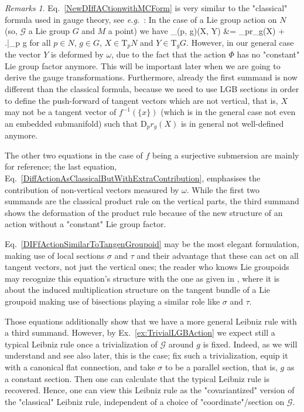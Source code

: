 \documentclass[a4paper,oneside,11pt,bibliography=totoc]{scrartcl}
\makeatletter
\def\oversortoftilde#1{\mathop{\vbox{\m@th\ialign{##\crcr\noalign{\kern3\p@}%
      \sortoftildefill\crcr\noalign{\kern3\p@\nointerlineskip}%
      $\hfil\displaystyle{#1}\hfil$\crcr}}}\limits}
\def\sortoftildefill{$\m@th \setbox\z@\hbox{$\braceld$}%
  \braceld\leaders\vrule \@height\ht\z@ \@depth\z@\hfill\braceru$}
\def\bas#1\eas{\begin{align*}#1\end{align*}}
\theoremstyle{plain}
\theoremstyle{remark}
\newtheorem{remark}[theorem]{Remarks}
\theoremstyle{definition}
\makeatother
\begin{document}
\begin{remark}
\leavevmode\newline
Eq.\ \eqref{NewDIffACtionwithMCForm} is very similar to the "classical" formula used in gauge theory, see \textit{e.g.}\ \cite[\S 3.5, Prop.\ 3.5.4, page 146]{Hamilton}: In the case of a Lie group action on $N$ (so, $\mathcal{G}$ a Lie group $G$ and $M$ a point) we have
\bas
\mathrm{D}_{(p, g)}\Phi(X, Y)
&=
_pr_g(X)
	+ \mleft.\oversortoftilde{(\mu_G)_g(Y)}\mright|_{p \cdot g}
\eas
for all $p \in N$, $g \in G$, $X \in \mathrm{T}_pN$ and $Y \in \mathrm{T}_g G$.
However, in our general case the vector $Y$ is deformed by $\omega$, due to the fact that the action $\Phi$ has no "constant" Lie group factor anymore. This will be important later when we are going to derive the gauge transformations. Furthermore, already the first summand is now different than the classical formula, because we need to use LGB sections in order to define the push-forward of tangent vectors which are not vertical, that is, $X$ may not be a tangent vector of $f^{-1}(\{x\})$ (which is in the general case not even an embedded submanifold) such that $\mathrm{D}_p r_g(X)$ is in general not well-defined anymore.

The other two equations in the case of $f$ being a surjective submersion are mainly for reference; the last equation, Eq.\ \eqref{DiffActionAsClassicalButWithExtraContribution}, emphasises the contribution of non-vertical vectors measured by $\omega$. While the first two summands are the classical product rule on the vertical parts, the third summand shows the deformation of the product rule because of the new structure of an action without a "constant" Lie group factor.

Eq.\ \eqref{DIFfActionSimilarToTangenGroupoid} may be the most elegant formulation, making use of local sections $\sigma$ and $\tau$ and their advantage that these can act on all tangent vectors, not just the vertical ones; the reader who knows Lie groupoids may recognize this equation's structure with the one as given in \cite[\S 1.4, Thm.\ 1.4.14, page 28]{mackenzieGeneralTheory}, where it is about the induced multiplication structure on the tangent bundle of a Lie groupoid making use of bisections playing a similar role like $\sigma$ and $\tau$.

Those equations additionally show that we have a more general Leibniz rule with a third summand. However, by Ex.\ \ref{ex:TrivialLGBAction} we expect still a typical Leibniz rule once a trivialization of $\mathcal{G}$ around $g$ is fixed. Indeed, as we will understand and see also later, this is the case; fix such a trivialization, equip it with a canonical flat connection, and take $\sigma$ to be a parallel section, that is, $g$ as a constant section. Then one can calculate that the typical Leibniz rule is recovered. Hence, one can view this Leibniz rule as the "covariantized" version of the "classical" Leibniz rule, independent of a choice of "coordinate"/section on $\mathcal{G}$. 
\end{remark}
\end{document}
